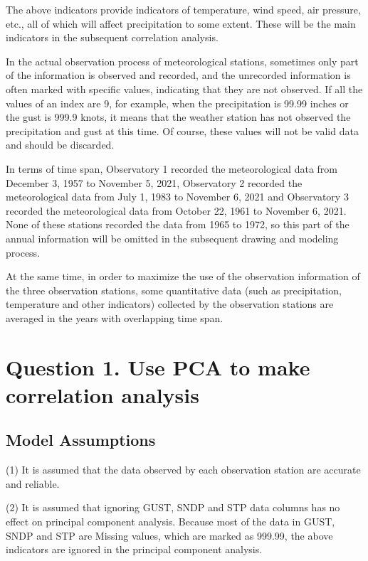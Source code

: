 \documentclass{swmcmthesis}
\begin{document}
\par
The above indicators provide indicators of temperature, wind speed, air pressure, etc., all of which will affect precipitation to some extent. These will be the main indicators in the subsequent correlation analysis.
\par
In the actual observation process of meteorological stations, sometimes only part of the information is observed and recorded, and the unrecorded information is often marked with specific values, indicating that they are not observed. If all the values of an index are 9, for example, when the precipitation is 99.99 inches or the gust is 999.9 knots, it means that the weather station has not observed the precipitation and gust at this time. Of course, these values will not be valid data and should be discarded.
\par
In terms of time span, Observatory 1 recorded the meteorological data from December 3, 1957 to November 5, 2021, Observatory 2 recorded the meteorological data from July 1, 1983 to November 6, 2021 and Observatory 3 recorded the meteorological data from October 22, 1961 to November 6, 2021. None of these stations recorded the data from 1965 to 1972, so this part of the annual information will be omitted in the subsequent drawing and modeling process.
\par
At the same time, in order to maximize the use of the observation information of the three observation stations, some quantitative data (such as precipitation, temperature and other indicators) collected by the observation stations are averaged in the years with overlapping time span.

\section{Question 1. Use PCA to make correlation analysis}

\subsection{Model Assumptions}
\hspace{1.25em}(1) It is assumed that the data observed by each observation station are accurate and reliable.
\par(2) It is assumed that ignoring GUST, SNDP and STP data columns has no effect on principal component analysis. Because most of the data in GUST, SNDP and STP are Missing values, which are marked as 999.99, the above indicators are ignored in the principal component analysis.
\end{document}
